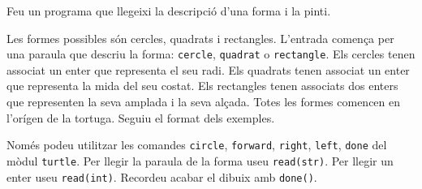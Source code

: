 

\Statement

Feu un programa que llegeixi la descripció d'una forma i la pinti.

\medskip

Les formes possibles són cercles, quadrats i rectangles. L'entrada comença per una paraula que descriu la forma: \texttt{cercle}, \texttt{quadrat} o \texttt{rectangle}. Els cercles tenen associat un enter que representa el seu radi. Els quadrats tenen associat un enter que representa la mida del seu costat. Els rectangles tenen associats dos enters que representen la seva amplada i la seva alçada. Totes les formes comencen en l'orígen de la tortuga. Seguiu el format dels exemples.

\medskip

Només podeu utilitzar les comandes 
\texttt{circle},
\texttt{forward},
\texttt{right},
\texttt{left},
\texttt{done} del mòdul \texttt{turtle}.
Per llegir la paraula de la forma useu \texttt{read(str)}.
Per llegir un enter useu \texttt{read(int)}.
Recordeu acabar el dibuix amb \texttt{done()}.

\Sample

